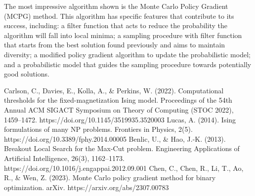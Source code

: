 \documentclass[conference]{IEEEtran}
\begin{document}
The most impressive algorithm shown is the Monte Carlo Policy Gradient (MCPG) method. This algorithm has specific features that contribute to its success, including: a filter function that acts to reduce the probability the algorithm will fall into local minima; a sampling procedure with filter function that starts from the best solution found previously and aims to maintain diversity; a modified policy gradient algorithm to update the probabilistic model; and a probabilistic model that guides the sampling procedure towards potentially good solutions.





\begin{thebibliography}{00}
Carlson, C., Davies, E., Kolla, A., \& Perkins, W. (2022). Computational thresholds for the fixed-magnetization Ising model. Proceedings of the 54th Annual ACM SIGACT Symposium on Theory of Computing (STOC 2022), 1459–1472. https://doi.org/10.1145/3519935.3520003
Lucas, A. (2014). Ising formulations of many NP problems. Frontiers in Physics, 2(5). https://doi.org/10.3389/fphy.2014.00005
Benlic, U., \& Hao, J.-K. (2013). Breakout Local Search for the Max-Cut problem. Engineering Applications of Artificial Intelligence, 26(3), 1162–1173. https://doi.org/10.1016/j.engappai.2012.09.001
Chen, C., Chen, R., Li, T., Ao, R., \& Wen, Z. (2023). Monte Carlo policy gradient method for binary optimization. arXiv. https://arxiv.org/abs/2307.00783


\end{thebibliography}
\end{document}
